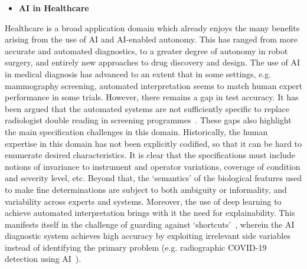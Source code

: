 \documentclass[sigconf,nonacm]{acmart}%
\begin{document}
\begin{itemize}[leftmargin=0.5cm]
	\item \textbf{AI in Healthcare}
\end{itemize}
Healthcare is a broad application domain which already enjoys the many benefits arising from the use of AI and AI-enabled autonomy. This has ranged from more accurate and automated diagnostics, to a greater degree of autonomy in robot surgery, and entirely new approaches to drug discovery and design. The use of AI in medical diagnosis has advanced to an extent that in some settings, e.g. mammography screening, automated interpretation seems to match human expert performance in some trials. However, there remains a gap in test accuracy. It has been argued that the automated systems are not sufficiently specific to replace radiologist double reading in screening programmes~\cite{Freemann1872}. These gaps also highlight the main specification challenges in this domain. Historically, the human expertise in this domain has not been explicitly codified, so that it can be hard to enumerate desired characteristics. It is clear that the specifications must include notions of invariance to instrument and operator variations, coverage of condition and severity level, etc. Beyond that, the `semantics' of the biological features used to make fine determinations are subject to both ambiguity or informality, and variability across experts and systems. Moreover, the use of deep learning to achieve automated interpretation brings with it the need for explainability. This manifests itself in the challenge of guarding against `shortcuts'~\cite{degrave2021ai}, wherein the AI diagnostic system achieves high accuracy by exploiting irrelevant side variables instead of identifying the primary problem (e.g. radiographic COVID-19 detection using AI~\cite{degrave2021ai}). 
\end{document}
